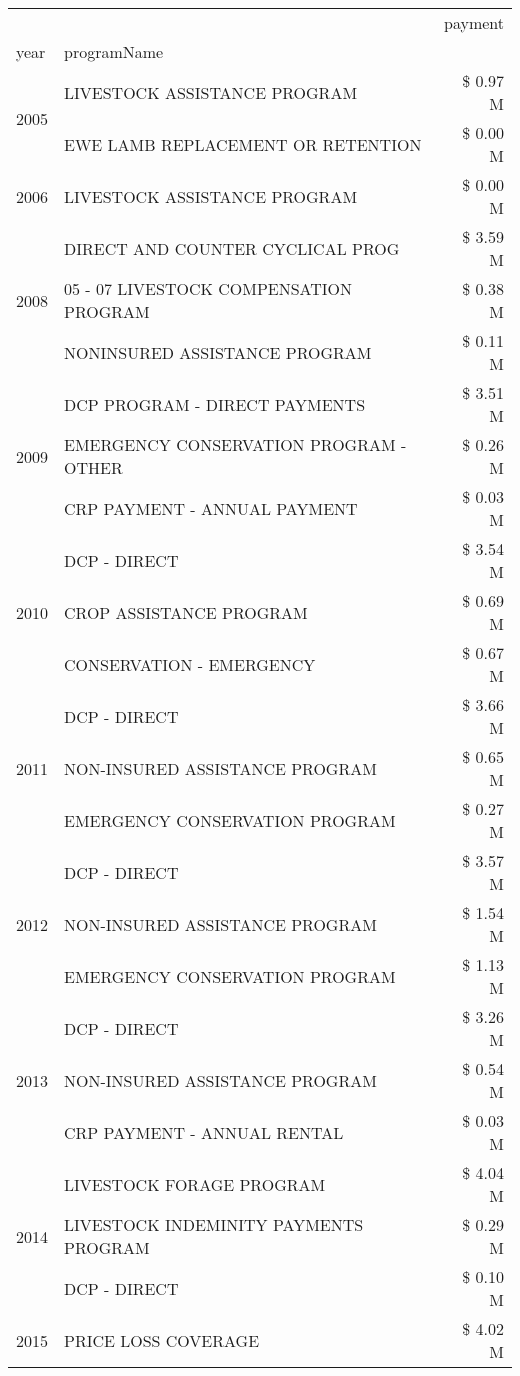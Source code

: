 \begin{tabular}{llr}
\toprule
 &  & payment \\
year & programName &  \\
\midrule
\multirow[t]{2}{*}{2005} & LIVESTOCK ASSISTANCE PROGRAM & \$ 0.97 M \\
 & EWE LAMB REPLACEMENT OR RETENTION & \$ 0.00 M \\
\cline{1-3}
2006 & LIVESTOCK ASSISTANCE PROGRAM & \$ 0.00 M \\
\cline{1-3}
\multirow[t]{3}{*}{2008} & DIRECT AND COUNTER CYCLICAL PROG & \$ 3.59 M \\
 & 05 - 07 LIVESTOCK COMPENSATION PROGRAM & \$ 0.38 M \\
 & NONINSURED ASSISTANCE PROGRAM & \$ 0.11 M \\
\cline{1-3}
\multirow[t]{3}{*}{2009} & DCP PROGRAM - DIRECT PAYMENTS & \$ 3.51 M \\
 & EMERGENCY CONSERVATION PROGRAM - OTHER & \$ 0.26 M \\
 & CRP PAYMENT - ANNUAL PAYMENT & \$ 0.03 M \\
\cline{1-3}
\multirow[t]{3}{*}{2010} & DCP - DIRECT & \$ 3.54 M \\
 & CROP ASSISTANCE PROGRAM & \$ 0.69 M \\
 & CONSERVATION - EMERGENCY & \$ 0.67 M \\
\cline{1-3}
\multirow[t]{3}{*}{2011} & DCP - DIRECT & \$ 3.66 M \\
 & NON-INSURED ASSISTANCE PROGRAM & \$ 0.65 M \\
 & EMERGENCY CONSERVATION PROGRAM & \$ 0.27 M \\
\cline{1-3}
\multirow[t]{3}{*}{2012} & DCP - DIRECT & \$ 3.57 M \\
 & NON-INSURED ASSISTANCE PROGRAM & \$ 1.54 M \\
 & EMERGENCY CONSERVATION PROGRAM & \$ 1.13 M \\
\cline{1-3}
\multirow[t]{3}{*}{2013} & DCP - DIRECT & \$ 3.26 M \\
 & NON-INSURED ASSISTANCE PROGRAM & \$ 0.54 M \\
 & CRP PAYMENT - ANNUAL RENTAL & \$ 0.03 M \\
\cline{1-3}
\multirow[t]{3}{*}{2014} & LIVESTOCK FORAGE PROGRAM & \$ 4.04 M \\
 & LIVESTOCK INDEMINITY PAYMENTS PROGRAM & \$ 0.29 M \\
 & DCP - DIRECT & \$ 0.10 M \\
\cline{1-3}
\multirow[t]{3}{*}{2015} & PRICE LOSS COVERAGE & \$ 4.02 M \\

\end{tabular}
